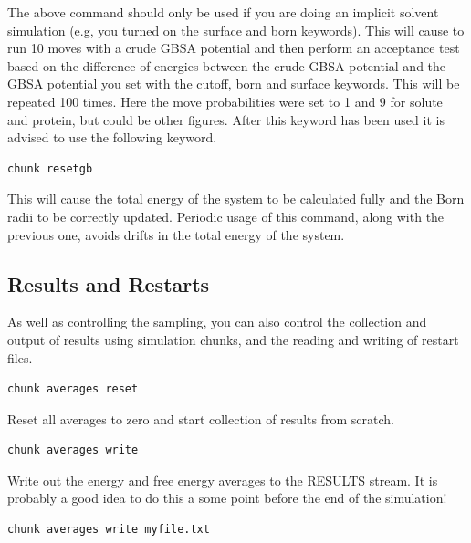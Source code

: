 \documentclass[letterpaper,10pt,english]{sphinxmanual}
\begin{document}
The above command should only be used if you are doing an implicit solvent simulation (e.g, you turned on the surface and born keywords). This will cause to run 10 moves with a crude GBSA potential and then perform an acceptance test based on the difference of energies between the crude GBSA potential and the GBSA potential you set with the cutoff, born and surface keywords. This will be repeated 100 times. Here the move probabilities were set to 1 and 9 for solute and protein, but could be other figures. After this keyword has been used it is advised to use the following keyword.

\begin{Verbatim}[commandchars=\\\{\}]
chunk resetgb
\end{Verbatim}

This will cause the total energy of the system to be calculated fully and the Born radii to be correctly updated. Periodic usage of this command, along with the previous one, avoids drifts in the total energy of the system.


\subsection{Results and Restarts}
\label{protoms:results-and-restarts}
As well as controlling the sampling, you can also control the collection and output of results using simulation chunks, and the reading and writing of restart files.

\begin{Verbatim}[commandchars=\\\{\}]
chunk averages reset
\end{Verbatim}

Reset all averages to zero and start collection of results from scratch.

\begin{Verbatim}[commandchars=\\\{\}]
chunk averages write
\end{Verbatim}

Write out the energy and free energy averages to the RESULTS stream. It is probably a good idea to do this a some point before the end of the simulation!

\begin{Verbatim}[commandchars=\\\{\}]
chunk averages write myfile.txt
\end{Verbatim}
\end{document}
